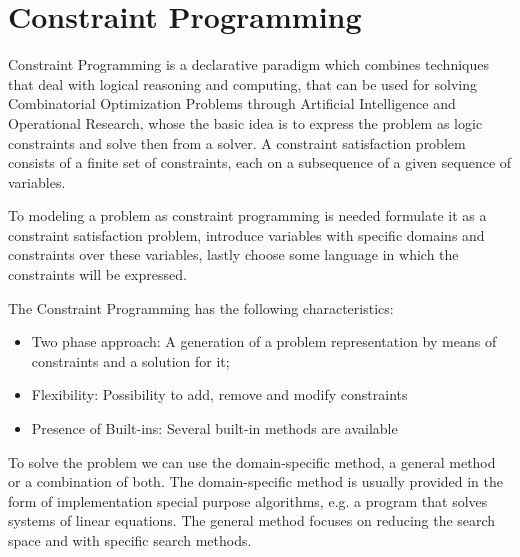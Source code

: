

\section{Constraint Programming}

Constraint Programming is a declarative paradigm which combines techniques that deal with logical reasoning and computing, that can be used for solving Combinatorial Optimization Problems through Artificial Intelligence and Operational Research, whose the basic idea is to express the problem as logic constraints and solve then from a solver. A constraint satisfaction problem consists of a finite set of constraints, each on a subsequence of a given sequence of variables\cite{Krzysztof:2003}.


To modeling a problem as constraint programming is needed formulate it as a constraint satisfaction problem, introduce variables with specific domains and constraints over these variables, lastly choose some language in which the constraints will be expressed\cite{Krzysztof:2003}. 

The Constraint Programming has the following characteristics:
\begin{itemize}
\item Two phase approach: A generation of a problem representation by means of constraints and a solution for it;
\item Flexibility: Possibility to add, remove and modify constraints
\item Presence of Built-ins: Several built-in methods are available
\end{itemize}

To solve the problem we can use the domain-specific method, a general method or a combination of both. The domain-specific method is usually provided in the form of implementation special purpose algorithms, e.g. a program that solves systems of linear equations. The general method focuses on reducing the search space and with specific search methods\cite{Krzysztof:2003}.  


